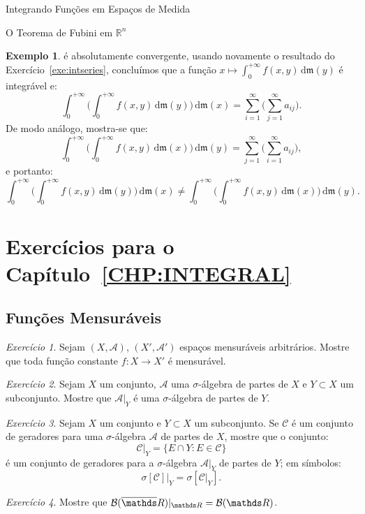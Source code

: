 \documentclass[oneside,final,11pt]{amsbook}
\newcommand{\R}{\mathds R}
\newcommand{\leb}{\mathfrak m}
\newcommand{\dd}{\mathrm d}
\newcommand{\Borel}{\mathcal B}
\theoremstyle{remark}\newtheorem{exercise}{Exercício}[chapter]
\theoremstyle{remark}\newtheorem{*exercise}[exercise]{\hbox to 0pt{\hskip 0pt minus 1fil*}Exercício}
\theoremstyle{definition}\newtheorem{exdefin}{Definição}[chapter]
\theoremstyle{plain}\newtheorem{teo}{Teorema}[section]
\theoremstyle{plain}\newtheorem{lem}[teo]{Lema}
\theoremstyle{plain}\newtheorem{prop}[teo]{Proposição}
\theoremstyle{plain}\newtheorem{cor}[teo]{Corolário}
\theoremstyle{definition}\newtheorem{defin}[teo]{Definição}
\theoremstyle{remark}\newtheorem{rem}[teo]{Observação}
\theoremstyle{definition}\newtheorem{notation}[teo]{Notação}
\theoremstyle{definition}\newtheorem{convention}[teo]{Convenção}
\theoremstyle{definition}\newtheorem{example}[teo]{Exemplo}
\numberwithin{section}{chapter}
\numberwithin{equation}{section}
\begin{document}
\begin{chapter}{Integrando Funções em Espaços de Medida}
\begin{section}[O Teorema de Fubini em $\R^n$]{O Teorema de Fubini em ${\R^n}$}
\begin{example}
é absolutamente convergente, usando novamente o resultado do Exercício~\ref{exe:intseries}, concluímos que
a função $x\mapsto\int_0^{+\infty}f(x,y)\,\dd\leb(y)$ é integrável e:
\[\int_0^{+\infty}\Big(\int_0^{+\infty}f(x,y)\,\dd\leb(y)\Big)\,\dd\leb(x)=
\sum_{i=1}^\infty\Big(\sum_{j=1}^\infty a_{ij}\Big).\]
De modo análogo, mostra-se que:
\[\int_0^{+\infty}\Big(\int_0^{+\infty}f(x,y)\,\dd\leb(x)\Big)\,\dd\leb(y)=
\sum_{j=1}^\infty\Big(\sum_{i=1}^\infty a_{ij}\Big),\]
e portanto:
\[\int_0^{+\infty}\Big(\int_0^{+\infty}f(x,y)\,\dd\leb(y)\Big)\,\dd\leb(x)\ne
\int_0^{+\infty}\Big(\int_0^{+\infty}f(x,y)\,\dd\leb(x)\Big)\,\dd\leb(y).\]
\end{example}

\end{section}

\section*{Exercícios para o Capítulo~\ref{CHP:INTEGRAL}}

\subsection*{Funções Mensuráveis}

\begin{exercise}\label{exe:constmens}
Sejam $(X,\mathcal A)$, $(X',\mathcal A')$ espaços mensuráveis arbitrários. Mostre que
toda função constante $f:X\to X'$ é mensurável.
\end{exercise}

\begin{exercise}\label{exe:AvertY}
Sejam $X$ um conjunto, $\mathcal A$ uma $\sigma$-álgebra de partes de $X$ e $Y\subset X$
um subconjunto. Mostre que $\mathcal A\vert_Y$ é uma $\sigma$-álgebra de partes de $Y$.
\end{exercise}

\begin{exercise}\label{exe:gerarestrita}
Sejam $X$ um conjunto e $Y\subset X$ um subconjunto. Se $\mathcal C$ é um conjunto de geradores
para uma $\sigma$-álgebra $\mathcal A$ de partes de $X$, mostre que o conjunto:
\[\mathcal C\vert_Y=\big\{E\cap Y:E\in\mathcal C\big\}\]
é um conjunto de geradores para a $\sigma$-álgebra $\mathcal A\vert_Y$ de partes de $Y$; em símbolos:
\[\sigma[\mathcal C]\vert_Y=\sigma[\mathcal C\vert_Y].\]
\end{exercise}

\begin{exercise}\label{exe:BorelbarRrestrR}
Mostre que $\Borel(\overline\R)\vert_{\R}=\Borel(\R)$.
\end{exercise}


\end{chapter}
\end{document}
